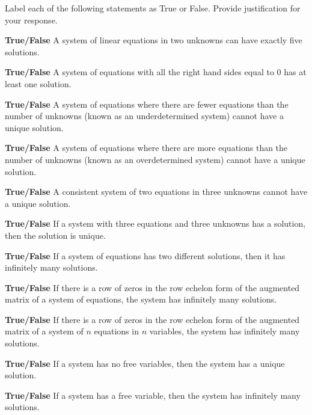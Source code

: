 \item Label each of the following statements as True or False. Provide justification for your response.
\ba
\item \textbf{True/False} A system of linear equations in two unknowns can have exactly five solutions.

\item \textbf{True/False} A system of equations with all the right hand sides equal to 0 has at least one solution.

\item \textbf{True/False} A system of equations where there are fewer equations than the number of unknowns (known as an underdetermined system) cannot have a unique solution.

\item \textbf{True/False} A system of equations where there are more equations than the number of unknowns (known as an overdetermined system) cannot have a unique solution.

\item \textbf{True/False} A consistent system of two equations in three unknowns cannot have a unique solution.

\item \textbf{True/False} If a system with three equations and three unknowns has a solution, then the solution is unique.

\item \textbf{True/False} If a system of equations has two different solutions, then it has infinitely many solutions.

\item \textbf{True/False} If there is a row of zeros in the row echelon form of the augmented matrix of a system of equations, the system has infinitely many solutions.

\item \textbf{True/False} If there is a row of zeros in the row echelon form of the augmented matrix of a system of $n$ equations in $n$ variables, the system has infinitely many solutions.

\item \textbf{True/False} If a system has no free variables, then the system has a unique solution.

\item \textbf{True/False} If a system has a free variable, then the system has infinitely many solutions.

\ea

\ee

